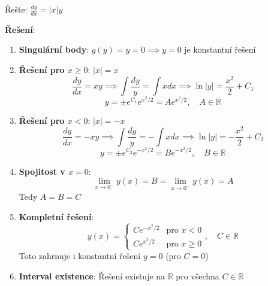 \begin{example}
    Řešte: $\frac{dy}{dx} = |x|y$
    \vspace{0.3\baselineskip}
    
    \textbf{Řešení}: 
    \begin{enumerate}
    \item \textbf{Singulární body}: $g(y) = y = 0 \implies y = 0$ je konstantní řešení
    
    \item \textbf{Řešení pro $x \geq 0$}: $|x| = x$
    \[
    \frac{dy}{dx} = xy \implies \int \frac{dy}{y} = \int x  dx \implies \ln|y| = \frac{x^2}{2} + C_1
    \]
    \[
    y = \pm e^{C_1} e^{x^2/2} = A e^{x^2/2}, \quad A \in \mathbb{R}
    \]
    
    \item \textbf{Řešení pro $x < 0$}: $|x| = -x$
    \[
    \frac{dy}{dx} = -xy \implies \int \frac{dy}{y} = -\int x  dx \implies \ln|y| = -\frac{x^2}{2} + C_2
    \]
    \[
    y = \pm e^{C_2} e^{-x^2/2} = B e^{-x^2/2}, \quad B \in \mathbb{R}
    \]
    
    \item \textbf{Spojitost v $x = 0$}: 
    \[
    \lim_{x \to 0^-} y(x) = B = \lim_{x \to 0^+} y(x) = A
    \]
    Tedy $A = B = C$
    
    \item \textbf{Kompletní řešení}:
    \[
    y(x) = \begin{cases}
    C e^{-x^2/2} & \text{pro } x < 0 \\
    C e^{x^2/2} & \text{pro } x \geq 0
    \end{cases}, \quad C \in \mathbb{R}
    \]
    Toto zahrnuje i konstantní řešení $y = 0$ (pro $C = 0$)
    
    \item \textbf{Interval existence}: Řešení existuje na $\mathbb{R}$ pro všechna $C \in \mathbb{R}$
    \end{enumerate}
    \end{example}

\vspace{0.6\baselineskip}

